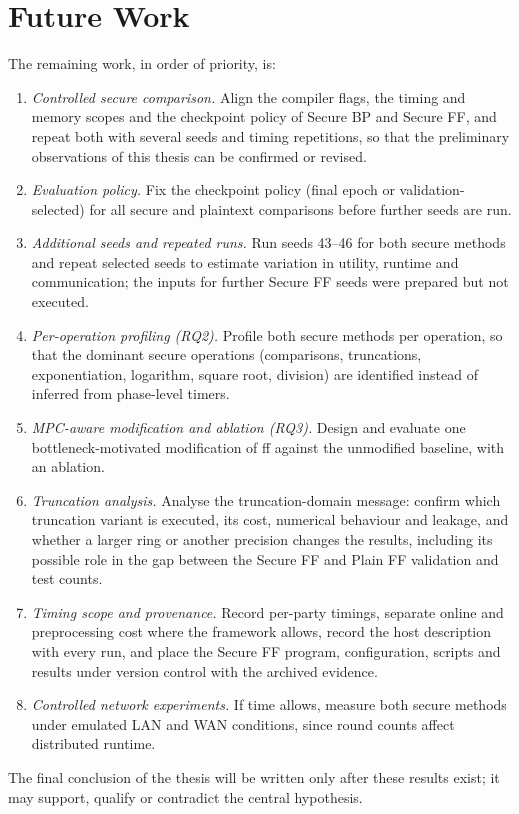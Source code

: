 \section{Future Work}\label{sec:concl-future}
The remaining work, in order of priority, is:
\begin{enumerate}
  \item \emph{Controlled secure comparison.} Align the compiler flags, the timing and memory scopes and the checkpoint policy of Secure BP and Secure FF, and repeat both with several seeds and timing repetitions, so that the preliminary observations of this thesis can be confirmed or revised.
  \item \emph{Evaluation policy.} Fix the checkpoint policy (final epoch or validation-selected) for all secure and plaintext comparisons before further seeds are run.
  \item \emph{Additional seeds and repeated runs.} Run seeds 43--46 for both secure methods and repeat selected seeds to estimate variation in utility, runtime and communication; the inputs for further Secure FF seeds were prepared but not executed.
  \item \emph{Per-operation profiling (RQ2).} Profile both secure methods per operation, so that the dominant secure operations (comparisons, truncations, exponentiation, logarithm, square root, division) are identified instead of inferred from phase-level timers.
  \item \emph{MPC-aware modification and ablation (RQ3).} Design and evaluate one bottleneck-motivated modification of \ac{ff} against the unmodified baseline, with an ablation.
  \item \emph{Truncation analysis.} Analyse the truncation-domain message: confirm which truncation variant is executed, its cost, numerical behaviour and leakage, and whether a larger ring or another precision changes the results, including its possible role in the gap between the Secure FF and Plain FF validation and test counts.
  \item \emph{Timing scope and provenance.} Record per-party timings, separate online and preprocessing cost where the framework allows, record the host description with every run, and place the Secure FF program, configuration, scripts and results under version control with the archived evidence.
  \item \emph{Controlled network experiments.} If time allows, measure both secure methods under emulated LAN and WAN conditions, since round counts affect distributed runtime.
\end{enumerate}
The final conclusion of the thesis will be written only after these results exist; it may support, qualify or contradict the central hypothesis.
